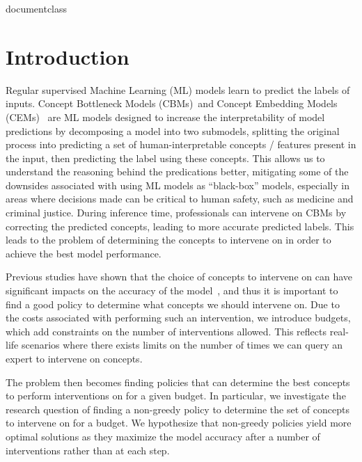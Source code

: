 \csname documentclass

\chapter{Introduction}
\label{firstcontentpage}


Regular supervised Machine Learning (ML) models learn to 
predict the labels of inputs.
Concept Bottleneck Models (CBMs)~\cite{cbm}and Concept Embedding Models (CEMs)~\cite{cem} are 
ML models designed to increase the interpretability of model predictions by decomposing a model into
two submodels, splitting the original process into predicting a set of human-interpretable
concepts / features present in the input, then predicting the label using these concepts.
This allows us to understand the reasoning behind the predications better, 
mitigating some of the downsides associated with using ML models as ``black-box'' models,
especially in areas where 
decisions made can be critical to 
human safety, such as medicine
and criminal justice.
During inference time, professionals can intervene on CBMs by correcting
the predicted concepts, leading to more accurate predicted labels. 
This leads to the problem of determining the concepts to intervene on in order
to achieve the best model performance.

Previous studies have shown that the choice of concepts to 
intervene on can have significant impacts on the accuracy of the model~\cite{coop, intcem},
and thus it is important to find a good policy to determine what concepts
we should intervene on.
Due to the costs
associated with performing such an intervention, we introduce budgets,
which add constraints on the number of interventions allowed. 
This
reflects real-life scenarios where
there exists limits on the number of times we 
can query an expert to intervene on concepts.

The problem then becomes finding policies that can determine the best 
concepts to perform interventions on for a given budget. In particular,
we investigate 
the research question of 
finding a non-greedy policy to determine
the set of concepts to intervene on for a budget.
We hypothesize that non-greedy policies
yield more optimal solutions as they maximize 
the model accuracy after a number of interventions rather than at each step.

